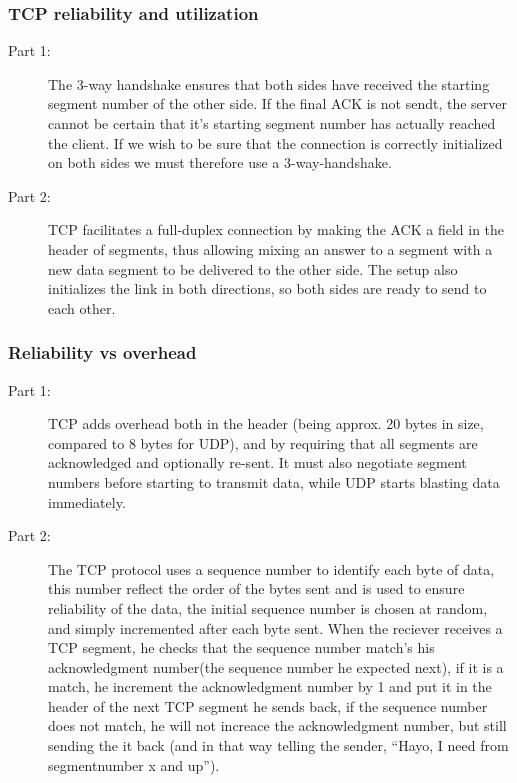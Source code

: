 \subsubsection{TCP reliability and utilization}
\begin{description}
    \item[Part 1:] The 3-way handshake ensures that both sides have received
        the starting segment number of the other side. If the final ACK is not
        sendt, the server cannot be certain that it's starting segment number
        has actually reached the client. If we wish to be sure that the
        connection is correctly initialized on both sides we must therefore use
        a 3-way-handshake.
    \item[Part 2:] TCP facilitates a full-duplex connection by making the ACK a
        field in the header of segments, thus allowing mixing an answer to a
        segment with a new data segment to be delivered to the other side. The
        setup also initializes the link in both directions, so both sides are
        ready to send to each other.
\end{description}

\subsubsection{Reliability vs overhead}
\begin{description}
    \item[Part 1:] TCP adds overhead both in the header (being approx. 20 bytes
        in size, compared to 8 bytes for UDP), and by requiring that all
        segments are acknowledged and optionally re-sent. It must also
        negotiate segment numbers before starting to transmit data, while UDP
        starts blasting data immediately.
    \item[Part 2:] The TCP protocol uses a sequence number to identify each
        byte of data, this number reflect the order of the bytes sent and is
        used to ensure reliability of the data, the initial sequence number is
        chosen at random, and simply incremented after each byte sent. When the
        reciever receives a TCP segment, he checks that the sequence number
        match's his acknowledgment number(the sequence number he expected
        next), if it is a match, he increment the acknowledgment number by 1 and
        put it in the header of the next TCP segment he sends back, if the
        sequence number does not match, he will not increace the acknowledgment
        number, but still sending the it back (and in that way telling the
        sender, ``Hayo, I need from segmentnumber x and up'').
\end{description}


